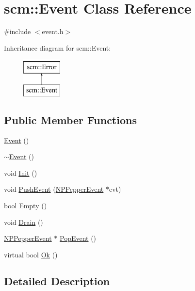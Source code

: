 \hypertarget{classscm_1_1_event}{
\section{scm::Event Class Reference}
\label{classscm_1_1_event}
}


{\ttfamily \#include $<$event.h$>$}

Inheritance diagram for scm::Event:\begin{figure}[H]
\begin{center}
\leavevmode
\includegraphics[height=2cm]{classscm_1_1_event}
\end{center}
\end{figure}
\subsection*{Public Member Functions}
\begin{DoxyCompactItemize}
\item 
\hyperlink{classscm_1_1_event_ae0b0fbe856c9fbce52b50e08860946e8}{Event} ()
\item 
\hyperlink{classscm_1_1_event_a4f22bf217daf2b5e3670e987579fb152}{$\sim$Event} ()
\item 
void \hyperlink{classscm_1_1_event_a2dfdf12d5b7918b2102e7ce1c4142ed3}{Init} ()
\item 
void \hyperlink{classscm_1_1_event_a1e1aa9fbe9b5e7e7c9b0ff8f0ba74cd2}{PushEvent} (\hyperlink{struct___n_p_pepper_event}{NPPepperEvent} $\ast$evt)
\item 
bool \hyperlink{classscm_1_1_event_ae736ee83efd335726cad841b6082e491}{Empty} ()
\item 
void \hyperlink{classscm_1_1_event_aba1e9492e1d03bd67afb9c8943e89fe9}{Drain} ()
\item 
\hyperlink{struct___n_p_pepper_event}{NPPepperEvent} $\ast$ \hyperlink{classscm_1_1_event_aaa7905956b3d789fa16cc7a73490dc5e}{PopEvent} ()
\item 
virtual bool \hyperlink{classscm_1_1_event_a95400a0d0218dfb664c028d1130a5d14}{Ok} ()
\end{DoxyCompactItemize}


\subsection{Detailed Description}


